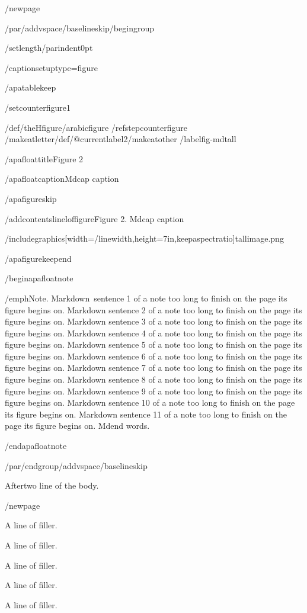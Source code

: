 /newpage{}

/par/addvspace{/baselineskip}/begingroup

/setlength{/parindent}{0pt}

/captionsetup{type=figure}

/apatablekeep

/setcounter{figure}{1}

/def/theHfigure{/arabic{figure}}%
/refstepcounter{figure}%
/makeatletter/def/@currentlabel{2}/makeatother%
/label{fig-mdtall}

/apafloattitle{Figure 2}

/apafloatcaption{Mdcap caption}

/apafigureskip

/addcontentsline{lof}{figure}{Figure 2. Mdcap caption}

/includegraphics[width=/linewidth,height=7in,keepaspectratio]{tallimage.png}

/apafigurekeepend

/begin{apafloatnote}

/emph{Note}. Markdown~sentence 1 of a note too long to finish on the
page its figure begins on. Markdown sentence 2 of a note too long to
finish on the page its figure begins on. Markdown sentence 3 of a note
too long to finish on the page its figure begins on. Markdown sentence 4
of a note too long to finish on the page its figure begins on. Markdown
sentence 5 of a note too long to finish on the page its figure begins
on. Markdown sentence 6 of a note too long to finish on the page its
figure begins on. Markdown sentence 7 of a note too long to finish on
the page its figure begins on. Markdown sentence 8 of a note too long to
finish on the page its figure begins on. Markdown sentence 9 of a note
too long to finish on the page its figure begins on. Markdown sentence
10 of a note too long to finish on the page its figure begins on.
Markdown sentence 11 of a note too long to finish on the page its figure
begins on. Mdend words.

/end{apafloatnote}

/par/endgroup/addvspace{/baselineskip}

Aftertwo line of the body.

/newpage{}

A line of filler.

A line of filler.

A line of filler.

A line of filler.

A line of filler.

